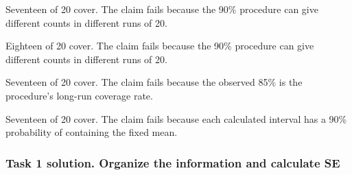 
\begin{answeroptions}
    \item Seventeen of 20 cover. The claim fails because the 90\% procedure can give different counts in different runs of 20.
    \item Eighteen of 20 cover. The claim fails because the 90\% procedure can give different counts in different runs of 20.
    \item Seventeen of 20 cover. The claim fails because the observed 85\% is the procedure's long-run coverage rate.
    \item Seventeen of 20 cover. The claim fails because each calculated interval has a 90\% probability of containing the fixed mean.
\end{answeroptions}

\clearpage
\subsubsection*{Task 1 solution. Organize the information and calculate SE}
\label{sol:c2-3-a}

